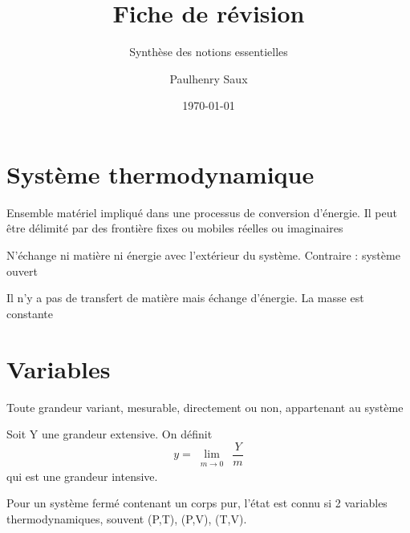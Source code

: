 \documentclass[french]{yLectureNote}
\title{Fiche de révision}
\subtitle{Synthèse des notions essentielles}
\author{Paulhenry Saux}
\date{\today}
\newcommand{\Lim}[1]{\lim\limits_{\substack{#1}}\:}
\begin{document}
\section{Système thermodynamique}

\begin{definition}
    Ensemble matériel impliqué dans une processus de conversion d'énergie. 
    Il peut \^etre délimité par des frontière fixes ou mobiles réelles ou imaginaires

\end{definition}

\begin{definition}
    N'échange ni matière ni énergie avec l'extérieur du système. Contraire : système ouvert
\end{definition}

\begin{definition}
    Il n'y a pas de transfert de matière mais échange d'énergie. La masse est constante

\end{definition}



\section{Variables}

\begin{definition}
    Toute grandeur variant, mesurable, directement ou non, appartenant au système

\end{definition}

\begin{definition}
    Soit Y une grandeur extensive. On définit $$y = \Lim{m\to 0}\frac{Y}{m}$$ qui est une grandeur intensive.

\end{definition}

\begin{theorem}
Pour un système fermé contenant un corps pur, l'état est connu si 2 variables thermodynamiques, souvent (P,T), (P,V), (T,V).

\end{theorem}
\end{document}
